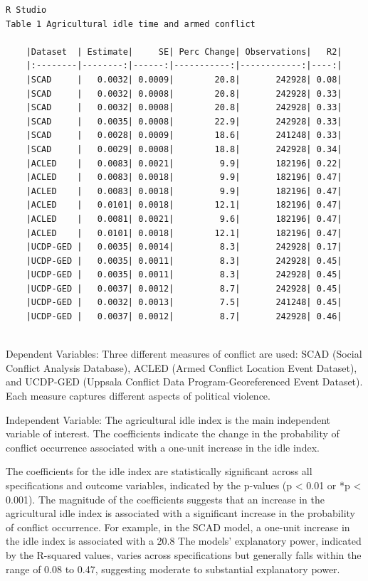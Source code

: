 \documentclass[12pt,letterpaper]{article}
\begin{document}
\begin{verbatim}
R Studio	
Table 1 Agricultural idle time and armed conflict

	|Dataset  | Estimate|     SE| Perc Change| Observations|   R2|
	|:--------|--------:|------:|-----------:|------------:|----:|
	|SCAD     |   0.0032| 0.0009|        20.8|       242928| 0.08|
	|SCAD     |   0.0032| 0.0008|        20.8|       242928| 0.33|
	|SCAD     |   0.0032| 0.0008|        20.8|       242928| 0.33|
	|SCAD     |   0.0035| 0.0008|        22.9|       242928| 0.33|
	|SCAD     |   0.0028| 0.0009|        18.6|       241248| 0.33|
	|SCAD     |   0.0029| 0.0008|        18.8|       242928| 0.34|
	|ACLED    |   0.0083| 0.0021|         9.9|       182196| 0.22|
	|ACLED    |   0.0083| 0.0018|         9.9|       182196| 0.47|
	|ACLED    |   0.0083| 0.0018|         9.9|       182196| 0.47|
	|ACLED    |   0.0101| 0.0018|        12.1|       182196| 0.47|
	|ACLED    |   0.0081| 0.0021|         9.6|       182196| 0.47|
	|ACLED    |   0.0101| 0.0018|        12.1|       182196| 0.47|
	|UCDP-GED |   0.0035| 0.0014|         8.3|       242928| 0.17|
	|UCDP-GED |   0.0035| 0.0011|         8.3|       242928| 0.45|
	|UCDP-GED |   0.0035| 0.0011|         8.3|       242928| 0.45|
	|UCDP-GED |   0.0037| 0.0012|         8.7|       242928| 0.45|
	|UCDP-GED |   0.0032| 0.0013|         7.5|       241248| 0.45|
	|UCDP-GED |   0.0037| 0.0012|         8.7|       242928| 0.46|	
	
\end{verbatim}

Dependent Variables: Three different measures of conflict are used: SCAD (Social Conflict Analysis Database), ACLED (Armed Conflict Location Event Dataset), and UCDP-GED (Uppsala Conflict Data Program-Georeferenced Event Dataset). Each measure captures different aspects of political violence.

Independent Variable: The agricultural idle index is the main independent variable of interest. The coefficients indicate the change in the probability of conflict occurrence associated with a one-unit increase in the idle index.


The coefficients for the idle index are statistically significant across all specifications and outcome variables, indicated by the p-values (p < 0.01 or *p < 0.001).
The magnitude of the coefficients suggests that an increase in the agricultural idle index is associated with a significant increase in the probability of conflict occurrence. For example, in the SCAD model, a one-unit increase in the idle index is associated with a 20.8%
The models' explanatory power, indicated by the R-squared values, varies across specifications but generally falls within the range of 0.08 to 0.47, suggesting moderate to substantial explanatory power.
\end{document}
